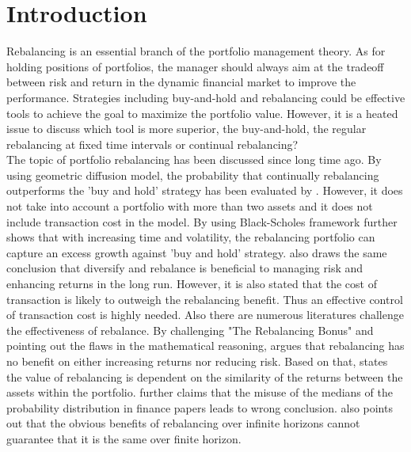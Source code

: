 \documentclass[
10pt, %
a4paper, %
oneside, %
headinclude,footinclude, %
BCOR5mm, %
]{scrartcl}
\begin{document}

\newpage %


\section{Introduction}

Rebalancing is an essential branch of the portfolio management theory. As for holding positions of portfolios, the manager should always aim at the tradeoff between risk and return in the dynamic financial market to improve the performance. Strategies including buy-and-hold and rebalancing could be effective tools to achieve the goal to maximize the portfolio value. However, it is a heated issue to discuss which tool is more superior, the buy-and-hold, the regular rebalancing at fixed time intervals or continual rebalancing?\\

The topic of portfolio rebalancing has been discussed since long time ago. By using geometric diffusion model, the probability that continually rebalancing outperforms the 'buy and hold' strategy has been evaluated by \cite{wise1996}. However, it does not take into account a portfolio with more than two assets and it does not include transaction cost in the model. By using Black-Scholes framework \cite{gabay2007} further shows that with increasing time and volatility, the rebalancing portfolio can capture an excess growth against 'buy and hold' strategy. \cite{bouchey2012} also draws the same conclusion that diversify and rebalance is beneficial to managing risk and enhancing returns in the long run. However, it is also stated that the cost of transaction is likely to outweigh the rebalancing benefit. Thus an effective control of transaction cost is highly needed. Also there are numerous literatures challenge the effectiveness of rebalance. By challenging "The Rebalancing Bonus" and pointing out the flaws in the mathematical reasoning, \cite{Edesess2014} argues that rebalancing has no benefit on either increasing returns nor reducing risk. Based on that, \cite{Kitces2015} states the value of rebalancing is dependent on the similarity of the returns between the assets within the portfolio. \cite{Edesess2016} further claims that the misuse of the medians of the probability distribution in finance papers leads to wrong conclusion. \cite{cuthbertson2016}
also points out that the obvious benefits of rebalancing over infinite horizons cannot guarantee that it is the same over finite horizon.\\
\end{document}
